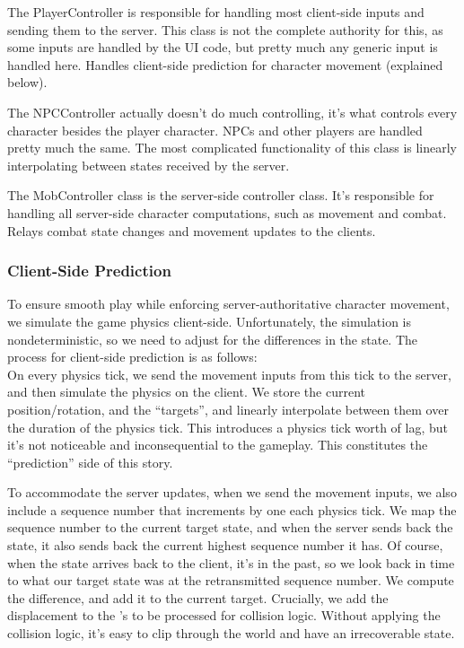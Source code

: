 \documentclass{article}
\begin{document}
The PlayerController is responsible for handling most client-side inputs
and sending them to the server. This class is not the complete authority
for this, as some inputs are handled by the UI code, but pretty much any
generic input is handled here. Handles client-side prediction for character
movement (explained below).

The NPCController actually doesn't do much controlling, it's what controls
every character besides the player character. NPCs and other players are handled
pretty much the same. The most complicated functionality of this class is
linearly interpolating between states received by the server.

The MobController class is the server-side controller class. It's responsible
for handling all server-side character computations, such as movement and
combat. Relays combat state changes and movement updates to the clients.
\subsubsection{Client-Side Prediction}
To ensure smooth play while enforcing server-authoritative character movement,
we simulate the game physics client-side. Unfortunately, the simulation
is nondeterministic, so we need to adjust for the differences in the state.
The process for client-side prediction is as follows:\\
On every physics tick, we send the movement inputs from this tick to
the server, and then simulate the physics on the client. We store the
current position/rotation, and the ``targets'', and linearly interpolate
between them over the duration of the physics tick. This introduces a
physics tick worth of lag, but it's not noticeable and inconsequential
to the gameplay. This constitutes the ``prediction'' side of this story.

To accommodate the server updates, when we send the movement inputs, we
also include a sequence number that increments by one each physics
tick. We map the sequence number to the current target state, and
when the server sends back the state, it also sends back the current
highest sequence number it has. Of course, when the state arrives back
to the client, it's in the past, so we look back in time to what our
target state was at the retransmitted sequence number. We compute the
difference, and add it to the current target. Crucially, we add the
displacement to the 's 
to be processed for collision logic. Without applying the collision logic, it's easy to clip through the world and have an irrecoverable state.
\end{document}
